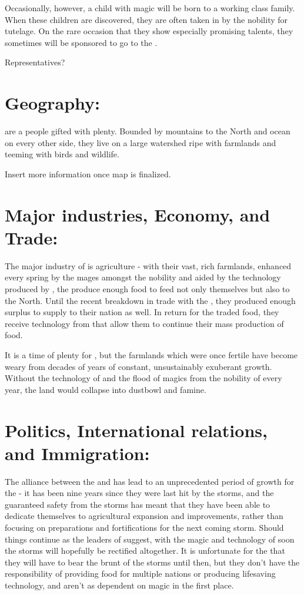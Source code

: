 \documentclass[blue]{GL2020}
\begin{document}
Occasionally, however, a child with magic will be born to a working class family.  When these children are discovered, they are often taken in by the nobility for tutelage.  On the rare occasion that they show especially promising talents, they sometimes will be sponsored to go to the \pSchool{}.

Representatives?

\section*{Geography:}

\pSunCh{} are a people gifted with plenty.  Bounded by mountains to the North and ocean on every other side, they live on a large watershed ripe with farmlands and teeming with birds and wildlife.  

Insert more information once map is finalized.

\section*{Major industries, Economy, and Trade:}

The major industry of \pSun{} is agriculture - with their vast, rich farmlands, enhanced every spring by the mages amongst the nobility and aided by the technology produced by \pCreators{}, the \pSunCh{} produce enough food to feed not only themselves but also  \pCreators{} to the North.  Until the recent breakdown in trade with the \pVikings{}, they produced enough surplus to supply to their nation as well.  In return for the traded food, they receive technology from \pCreators{} that allow them to continue their mass production of food.

It is a time of plenty for \pSunCh{}, but the farmlands which were once fertile have become weary from decades of years of constant, unsustainably exuberant growth.  Without the technology of \pCreators{} and the flood of magics from the nobility of \pSun{} every year, the land would collapse into dustbowl and famine.

\section*{Politics, International relations, and Immigration:}

The alliance between the \pSun{} and \pCreators{} has lead to an unprecedented period of growth for the \pSunCh{} - it has been nine years since they were last hit by the storms, and the guaranteed safety from the storms has meant that they have been able to dedicate themselves to agricultural expansion and improvements, rather than focusing on preparations and fortifications for the next coming storm.  Should things continue as the leaders of \pCreators{} suggest, with the magic and technology of \pCreators{} soon the storms will hopefully be rectified altogether.  It is unfortunate for the \pVikings{} that they will have to bear the brunt of the storms until then, but they don't have the responsibility of providing food for multiple nations or producing lifesaving technology, and aren't as dependent on magic in the first place.
\end{document}
